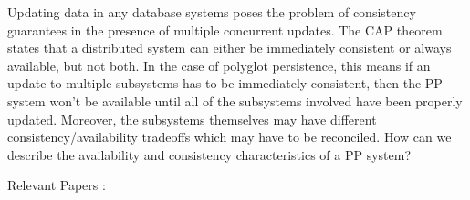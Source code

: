 Updating data in any database systems poses the problem of consistency guarantees in the presence of multiple concurrent updates. The CAP theorem ~\cite{Gilbert2002} states that a distributed system can either be immediately consistent or always available, but not both. In the case of polyglot persistence, this means if an update to multiple subsystems has to be immediately consistent, then the PP system won't be available until all of the subsystems involved have been properly updated. Moreover, the subsystems themselves may have different consistency/availability tradeoffs which may have to be reconciled. How can we describe the availability and consistency characteristics of a PP system?

Relevant Papers :  ~\cite{Botan2009} ~\cite{Botan2010} ~\cite{Sharp2013}  ~\cite{Atzeni2012} ~\cite{Sellami2014} ~\cite{Sellami2013}
 ~\cite{Fowler2012} ~\cite{Das2013}